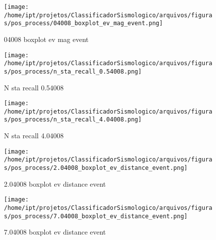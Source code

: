                     \begin{figure}[H]
                        \centering
                        \texttt{[image: /home/ipt/projetos/ClassificadorSismologico/arquivos/figuras/pos\_process/04008\_boxplot\_ev\_mag\_event.png]}
                        \caption{04008 boxplot ev mag event}
                        \label{fig:04008_boxplot_ev_mag_event}
                    \end{figure}
                

                    \begin{figure}[H]
                        \centering
                        \texttt{[image: /home/ipt/projetos/ClassificadorSismologico/arquivos/figuras/pos\_process/n\_sta\_recall\_0.54008.png]}
                        \caption{N sta recall 0.54008}
                        \label{fig:n_sta_recall_0.54008}
                    \end{figure}
                

                    \begin{figure}[H]
                        \centering
                        \texttt{[image: /home/ipt/projetos/ClassificadorSismologico/arquivos/figuras/pos\_process/n\_sta\_recall\_4.04008.png]}
                        \caption{N sta recall 4.04008}
                        \label{fig:n_sta_recall_4.04008}
                    \end{figure}
                

                    \begin{figure}[H]
                        \centering
                        \texttt{[image: /home/ipt/projetos/ClassificadorSismologico/arquivos/figuras/pos\_process/2.04008\_boxplot\_ev\_distance\_event.png]}
                        \caption{2.04008 boxplot ev distance event}
                        \label{fig:2.04008_boxplot_ev_distance_event}
                    \end{figure}
                

                    \begin{figure}[H]
                        \centering
                        \texttt{[image: /home/ipt/projetos/ClassificadorSismologico/arquivos/figuras/pos\_process/7.04008\_boxplot\_ev\_distance\_event.png]}
                        \caption{7.04008 boxplot ev distance event}
                        \label{fig:7.04008_boxplot_ev_distance_event}
                    \end{figure}
                

